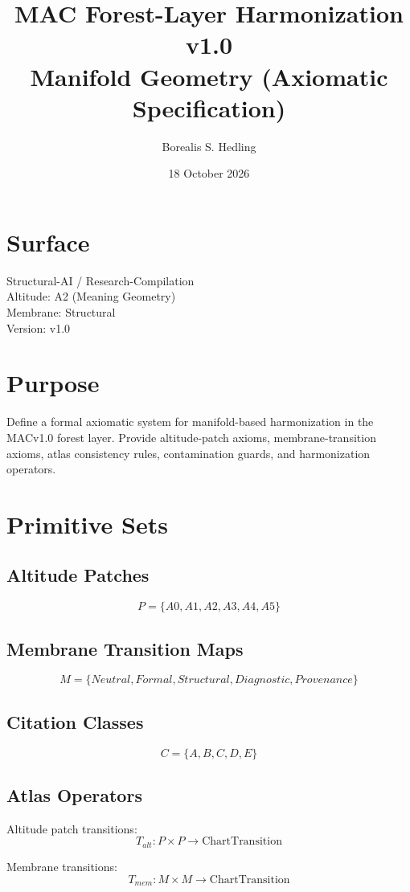 \documentclass[11pt]{article}
\title{MAC Forest-Layer Harmonization v1.0 \\ Manifold Geometry (Axiomatic Specification)}
\author{Borealis S. Hedling}
\date{18 October 2026}
\begin{document}
\maketitle

\section*{Surface}
Structural-AI / Research-Compilation \\
Altitude: A2 (Meaning Geometry) \\
Membrane: Structural \\
Version: v1.0

\section{Purpose}
Define a formal axiomatic system for manifold-based harmonization in the MACv1.0
forest layer. Provide altitude-patch axioms, membrane-transition axioms, atlas
consistency rules, contamination guards, and harmonization operators.

\section{Primitive Sets}

\subsection{Altitude Patches}
\[
P = \{A0, A1, A2, A3, A4, A5\}
\]

\subsection{Membrane Transition Maps}
\[
M = \{Neutral, Formal, Structural, Diagnostic, Provenance\}
\]

\subsection{Citation Classes}
\[
C = \{A, B, C, D, E\}
\]

\subsection{Atlas Operators}
Altitude patch transitions:
\[
T_{alt} : P \times P \rightarrow \text{ChartTransition}
\]

Membrane transitions:
\[
T_{mem} : M \times M \rightarrow \text{ChartTransition}
\]
\end{document}
